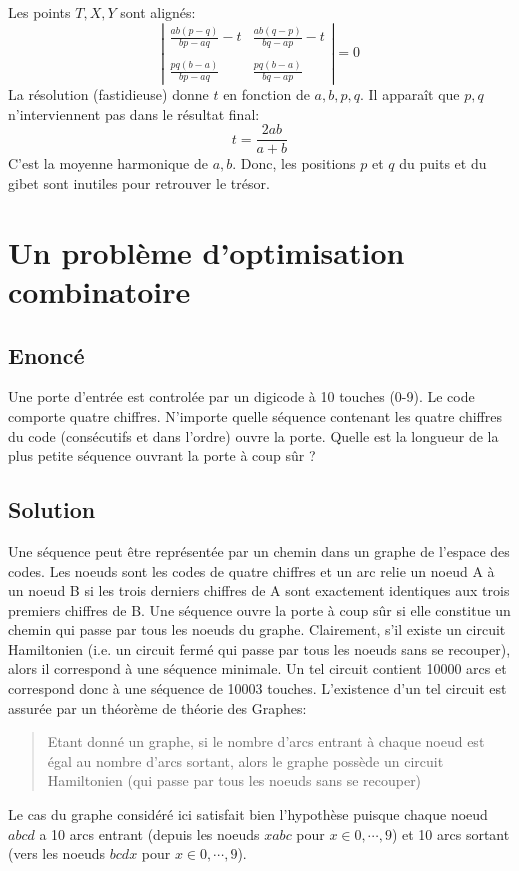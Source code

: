 \documentclass{article}
\begin{document}
Les points $T,X,Y$ sont alignés:
\[
\left|
\begin{array}{cc}
\frac{ab(p-q)}{bp-aq}-t & \frac{ab(q-p)}{bq-ap}-t\\ \\
\frac{pq(b-a)}{bp-aq} & \frac{pq(b-a)}{bq-ap}
\end{array}
\right| = 0
\]
La résolution (fastidieuse) donne $t$ en fonction de $a,b,p,q$. Il apparaît que $p,q$ n'interviennent pas dans le résultat final:
\[
t=\frac{2ab}{a+b}
\]
C'est la moyenne harmonique de $a,b$. Donc, les positions $p$ et $q$ du puits et du gibet sont inutiles pour retrouver le trésor.
\pagebreak

\section{Un problème d'optimisation combinatoire}

\subsection{Enoncé}
Une porte d'entrée est controlée par un digicode à 10 touches (0-9). Le code comporte quatre chiffres. N'importe quelle séquence contenant les quatre chiffres du code (consécutifs et dans l'ordre) ouvre la porte. Quelle est la longueur de la plus petite séquence ouvrant la porte à coup sûr ?
\subsection{Solution}
Une séquence peut être représentée par un chemin dans un graphe de l'espace des codes. Les noeuds sont les codes de quatre chiffres et un arc relie un noeud A à un noeud B si les trois derniers chiffres de A sont exactement identiques aux trois premiers chiffres de B. Une séquence ouvre la porte à coup sûr si elle constitue un chemin qui passe par tous les noeuds du graphe. Clairement, s'il existe un circuit Hamiltonien (i.e. un circuit fermé qui passe par tous les noeuds sans se recouper), alors il correspond à une séquence minimale. Un tel circuit contient 10000 arcs et correspond donc à une séquence de 10003 touches. L'existence d'un tel circuit est assurée par un théorème de théorie des Graphes:
\begin{quote}
Etant donné un graphe, si le nombre d'arcs entrant à chaque noeud est égal au nombre d'arcs sortant, alors le graphe possède un circuit Hamiltonien (qui passe par tous les noeuds sans se recouper)
\end{quote}
Le cas du graphe considéré ici satisfait bien l'hypothèse puisque chaque noeud $abcd$ a 10 arcs entrant (depuis les noeuds $xabc$ pour $x\in0,\cdots,9$) et 10 arcs sortant (vers les noeuds $bcdx$ pour $x\in0,\cdots,9$).
\pagebreak
\end{document}
